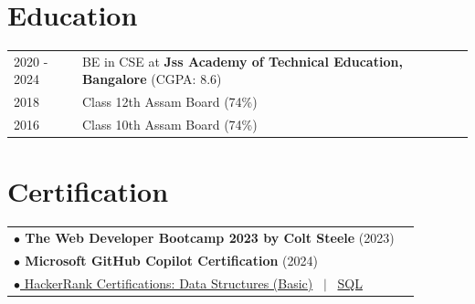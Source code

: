 \documentclass[a4paper,11pt]{article}
\begin{document}
\section{Education}
\begin{tabularx}{\linewidth}{@{}l X@{}}
2020 - 2024 & BE in CSE at \textbf{Jss Academy of Technical Education, Bangalore} \hfill \normalsize (CGPA: 8.6) \\
2018 &      Class 12th  Assam Board \hfill  (74\%) \\
2016 &      Class 10th  Assam Board \hfill  (74\%) \\
\end{tabularx}

\section{Certification}
\begin{tabularx}{\linewidth}{@{}l r@{}}
\textbf{$\bullet$ The Web Developer Bootcamp 2023 by Colt Steele} \hfill (2023) \\[3pt]
\textbf{$\bullet$ Microsoft GitHub Copilot Certification} \hfill (2024) \\[3pt]
\href{https://www.hackerrank.com/certificates/c703269ff0d5m}{$\bullet$ HackerRank Certifications: Data Structures (Basic)} \ $|$ \
\href{https://www.hackerrank.com/certificates/0b6cd38724b5/}{SQL}
\end{tabularx}

\vfill
\end{document}
